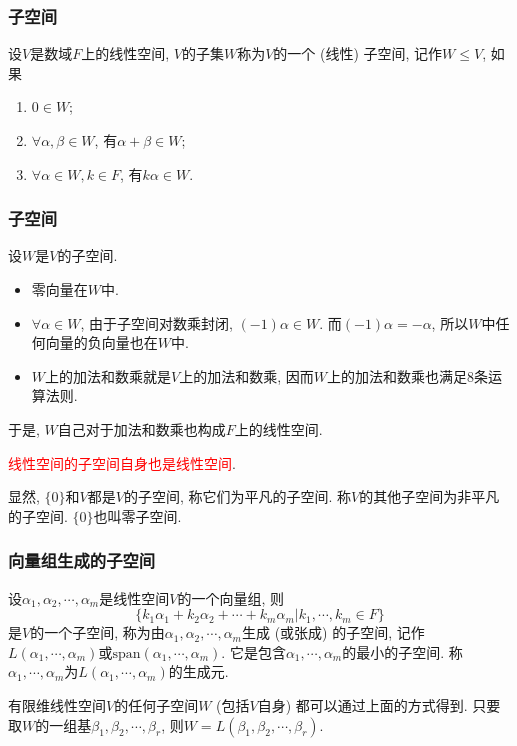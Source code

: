 \documentclass[CJK]{beamer}
\begin{document}
\begin{frame}
	\frametitle{子空间} \pause
	\begin{definition}
		设$V$是数域$F$上的线性空间, $V$的子集$W$称为$V$的一个 (线性) 子空间, 记作$W\leqslant V$, 如果 \begin{enumerate}[1]
			\item $0\in W$;
			\item $\forall\alpha, \beta\in W$, 有$\alpha+\beta\in W$;
			\item $\forall\alpha\in W, k\in F$, 有$k\alpha\in W$.
		\end{enumerate}
	\end{definition}
\end{frame}

\begin{frame}
\frametitle{子空间} \pause
设$W$是$V$的子空间. \pause
\begin{itemize}
	\item 零向量在$W$中. \pause
	\item $\forall\alpha\in W$, 由于子空间对数乘封闭, $(-1)\alpha\in W$. 而$(-1)\alpha=-\alpha$, 所以$W$中任何向量的负向量也在$W$中. \pause
	\item $W$上的加法和数乘就是$V$上的加法和数乘, 因而$W$上的加法和数乘也满足$8$条运算法则. 
\end{itemize}

于是, $W$自己对于加法和数乘也构成$F$上的线性空间.\pause

\vspace{2ex}

\textcolor{red}{线性空间的子空间自身也是线性空间}.\pause

\vspace{0.5cm}

显然, $\{0\}$和$V$都是$V$的子空间, 称它们为平凡的子空间. 称$V$的其他子空间为非平凡的子空间. $\{0\}$也叫零子空间.
\end{frame}

\begin{frame}
	\frametitle{向量组生成的子空间} \pause
	\begin{definition}
		设$\alpha_{1}, \alpha_{2}, \cdots, \alpha_{m}$是线性空间$V$的一个向量组, 则\[\{k_{1}\alpha_{1}+k_{2}\alpha_{2}+\cdots+k_{m}\alpha_{m}| k_{1}, \cdots, k_{m}\in F\}\]
		是$V$的一个子空间, 称为由$\alpha_{1}, \alpha_{2}, \cdots, \alpha_{m}$生成 (或张成) 的子空间, 记作$L(\alpha_{1}, \cdots, \alpha_{m})$或$\mathrm{span}(\alpha_{1}, \cdots, \alpha_{m})$. 它是包含$\alpha_{1}, \cdots, \alpha_{m}$的最小的子空间. 称$\alpha_{1}, \cdots, \alpha_{m}$为$L(\alpha_{1}, \cdots, \alpha_{m})$的生成元.
	\end{definition} \pause

\vspace{0.5cm}

有限维线性空间$V$的任何子空间$W$ (包括$V$自身) 都可以通过上面的方式得到. 只要取$W$的一组基$\beta_{1}, \beta_{2}, \cdots, \beta_{r}$, 则$W=L(\beta_{1}, \beta_{2}, \cdots, \beta_{r})$.
\end{frame}
\end{document}
